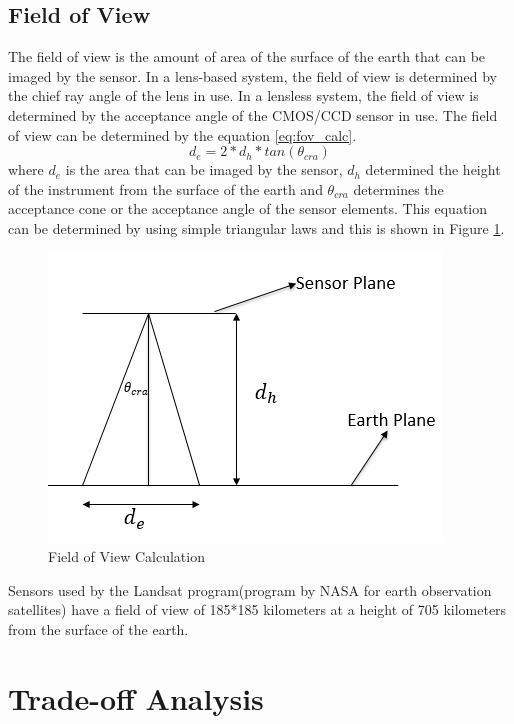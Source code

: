 \subsection{Field of View}
The field of view is the amount of area of the surface of the earth that can be imaged by the sensor. In a lens-based system, the field of view is determined by the chief ray angle of the lens in use. In a lensless system, the field of view is determined by the acceptance angle of the CMOS/CCD sensor in use. The field of view can be determined by the equation \ref{eq:fov_calc}.
\begin{equation}
\label{eq:fov_calc}
d_e = 2*d_h*tan(\theta_{cra})
\end{equation}
where $d_e$ is the area that can be imaged by the sensor, $d_h$ determined the height of the instrument from the surface of the earth and $\theta_{cra}$ determines the acceptance cone or the acceptance angle of the sensor elements. This equation can be determined by using simple triangular laws and this is shown in Figure \ref{fig:fov_calc}.
\begin{figure}[htb]
\includegraphics[width=\textwidth]{pics/fov}
\caption{Field of View Calculation}
\label{fig:fov_calc}
\end{figure}
Sensors used by the Landsat program(program by NASA for earth observation satellites) have a field of view of 185*185 kilometers at a height of 705 kilometers from the surface of the earth\cite{landsat}. 

\section{Trade-off Analysis}
\label{sec:tradeOff}
